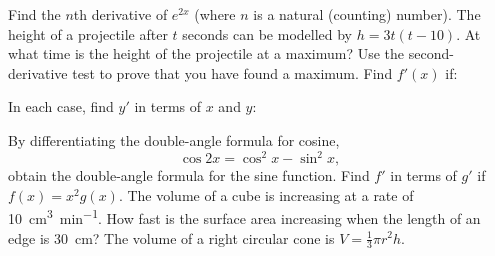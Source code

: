 \begin{questions}
  \questioM Find the $ n$th derivative of $ e^{2x} $ (where $ n $ is a natural (counting) number).
  \questioE The height of a projectile after $ t $ seconds can be modelled by $ h = 3t(t - 10) $. At what time
            is the height of the projectile at a maximum? Use the second-derivative test to prove that you have
            found a maximum.
  \clearpage
  \questioM Find $ f'(x) $ if:
  \questioM In each case, find $ y' $ in terms of $ x $ and $ y $:
  \questioM By differentiating the double-angle formula for cosine,
            \begin{displaymath}
              \cos 2x = \cos^2 x - \sin^2 x,
            \end{displaymath}
            obtain the double-angle formula for the sine function.
  \questioM Find $ f' $ in terms of $ g' $ if $ f(x) = x^2 g(x) $.
  \questioM The volume of a cube is increasing at a rate of \SI{10}{\centi\metre\cubed\per\minute}. How fast is the surface
            area increasing when the length of an edge is \SI{30}{\centi\metre}?
  \questioM The volume of a right circular cone is $ V = \frac{1}{3} \pi r^2 h $.
    \begin{parts}

\end{parts}
\end{questions}
